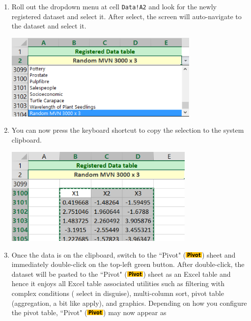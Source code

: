 \documentclass[article]{jss}
\numberwithin{equation}{subsection}
\newcommand{\shtPivot}{``Pivot" (\includegraphics[height=8pt, keepaspectratio=true]{img/PivotSheetTab_png}) }
\begin{document}
\begin{enumerate}
\begin{center}
        \end{center}
        \item Roll out the dropdown menu at cell \texttt{Data!A2} and look for the newly registered dataset and select it. After select, the screen will auto-navigate to the dataset and select it.
        \begin{center}
	        \vspace{-10pt}\includegraphics[height=120pt, keepaspectratio=true]{img/DataSheet_LocateDatasetViaMenu_png}\vspace{-10pt}
        \end{center}
        \item You can now press the keyboard shortcut to copy the selection to the system clipboard.
        \begin{center}
	        \vspace{-10pt}\includegraphics[height=136pt,keepaspectratio=true]{img/DataSheet_CopyDataset_png}\vspace{-10pt}
        \end{center}
        \item Once the data is on the clipboard, switch to the \shtPivot sheet and immediately double-click on the top-left green button. After double-click, the dataset will be pasted to the \shtPivot sheet as an Excel table and hence it enjoys all Excel table associated utilities such as filtering with complex conditions ( select in disguise), multi-column sort, pivot table (aggregation, a bit like  apply), and graphics. Depending on how you configure the pivot table, \shtPivot may now appear as
        \begin{center}

\end{center}
\end{enumerate}
\end{document}
